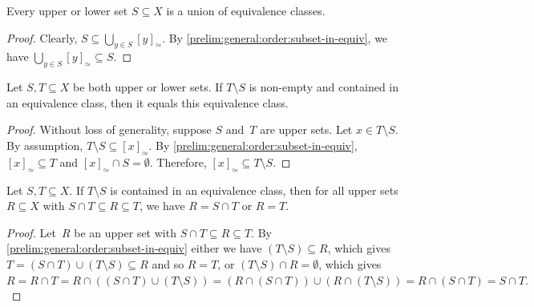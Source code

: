 \begin{corollary} \label{prelim:general:order:upper-union-equiv-class}
	Every upper or lower set $S \subseteq X$ is a union of equivalence classes.
\end{corollary}
\begin{proof}
 Clearly, $S \subseteq \bigcup_{y \in S} [y]_{\simeq}$.
 By \cref{prelim:general:order:subset-in-equiv}, 
 we have $\bigcup_{y \in S} [y]_{\simeq} \subseteq S$.
\end{proof}

\begin{corollary} \label{prelim:automata:cor:SsetminusT}
	Let $S, T \subseteq X$ be both upper or lower sets.	
	If $T \setminus S$ is non-empty and contained in an equivalence class,
	then it equals this equivalence class.
\end{corollary}
\begin{proof}
    Without loss of generality, suppose $S$ and~$T$ are upper sets.
	Let $x \in T \setminus S$.
	By assumption, $T \setminus S \subseteq [x]_{\simeq}$.
	By \cref{prelim:general:order:subset-in-equiv},
	$[x]_{\simeq} \subseteq T$
	and $[x]_{\simeq} \cap S = \emptyset$.
	Therefore, $[x]_{\simeq} \subseteq T \setminus S$.
\end{proof}

\begin{lemma}\label{prelim:general:order:lem:diff-in-equiv-class}
	Let $S,T \subseteq X$.
	If $T \setminus S$ is contained in an equivalence class, then
	for all upper sets $R \subseteq X$ with $S \cap T \subseteq R \subseteq T$, 
	we have $R = S \cap T$ or $R = T$.
\end{lemma}
\begin{proof} 
	Let~$R$ be an upper set	with $S\cap T \subseteq R \subseteq T$.
	By \cref{prelim:general:order:subset-in-equiv}
	either we have $( T \setminus S ) \subseteq R$, which gives $T = (S \cap T) \cup (T \setminus S) \subseteq R$
	and so $R = T$,
	or $(T \setminus S) \cap R = \emptyset$,
	which gives 
	$
	R = R \cap T = R \cap ( (S \cap T) \cup (T \setminus S) ) = ( R \cap ( S \cap T ) ) \cup ( R \cap ( T \setminus S ) )
	= R \cap (S \cap T) = S \cap T.
	$		
\end{proof}

